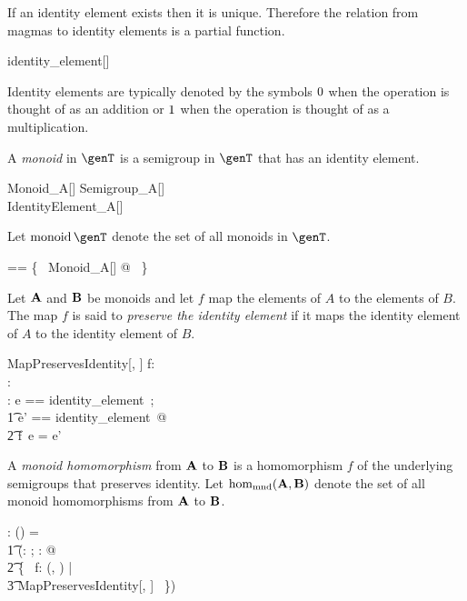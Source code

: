 \documentclass{amsart}
\begin{document}
\begin{remark}
If an identity element exists then it is unique.
Therefore the relation from magmas to identity elements is a partial function.

\begin{zed}
identity\_element[\setT] \in \magma \setT \pfun \setT
\end{zed}

\end{remark}

Identity elements are typically denoted by the symbols  $0$ when the operation is thought of as an addition
or $1$ when the operation is thought of as a multiplication.

A {\em monoid} in $\genT$ is a semigroup in $\genT$ that has an identity element.
\begin{schema}{Monoid\_A}[\genT]
	Semigroup\_A[\genT] \\
	IdentityElement\_A[\genT]
\end{schema}

Let $\monoid \genT$ denote the set of all monoids in $\genT$.
\begin{zed}
	\monoid \genT == \{~ Monoid\_A[\genT] @ \strucA ~\}
\end{zed}


Let $\mathbf{A}$ and $\mathbf{B}$ be monoids and let $f$ map the elements of $A$ to the elements of $B$.
The map $f$ is said to {\em preserve the identity element} if it maps the identity element of $A$
to the identity element of $B$.
\begin{schema}{MapPreservesIdentity}[\genT, \genU]
	f: \genT \pfun \genU \\
	\strucA: \monoid \genT \\
	\strucB: \monoid \genU
\where
\LET e == identity\_element~\strucA; \\
\t1	e' == identity\_element~\strucB @ \\
\t2		f~e = e'
\end{schema}

A {\em monoid homomorphism} from $\mathbf{A}$ to $\mathbf{B}$ is a homomorphism $f$ of the underlying semigroups
that preserves identity.
Let $\operatorname{hom_{mnd}}(\mathbf{A}, \mathbf{B})$ denote the set of all monoid homomorphisms from $\mathbf{A}$ to $\mathbf{B}$.
\begin{gendef}[\genT, \genU]
	\homMonoid: \monoid \genT \cross \monoid \genU \fun \power (\genT \fun \genU)
\where
	\homMonoid = \\
	\t1	(\lambda \strucA: \monoid \genT; \strucB: \monoid \genU @ \\
	\t2		\{~ f: \homSemigroup(\strucA, \strucB) | \\
	\t3			MapPreservesIdentity[\genT, \genU] ~\})
\end{gendef}
\end{document}
